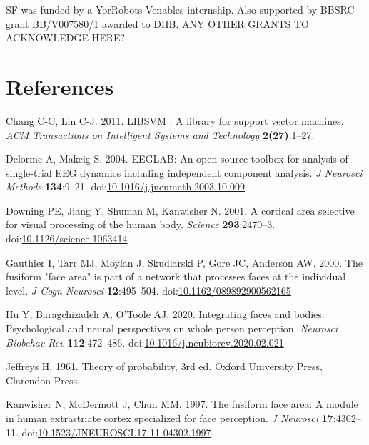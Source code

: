 \documentclass[
]{article}
\newlength{\cslhangindent}
\newlength{\cslentryspacingunit} %
\newenvironment{CSLReferences}[2] %
 {%
  \setlength{\parindent}{0pt}
  \ifodd #1
  \let\oldpar\par
  \def\par{\hangindent=\cslhangindent\oldpar}
  \fi
  \setlength{\parskip}{#2\cslentryspacingunit}
 }%
 {}
\begin{document}
SF was funded by a YorRobots Venables internship. Also supported by BBSRC grant BB/V007580/1 awarded to DHB. ANY OTHER GRANTS TO ACKNOWLEDGE HERE?

\hypertarget{references}{%
\section*{References}\label{references}}

\hypertarget{refs}{}
\begin{CSLReferences}{1}{0}
\leavevmode{}%
Chang C-C, Lin C-J. 2011. {LIBSVM} : A library for support vector machines. \emph{ACM Transactions on Intelligent Systems and Technology} \textbf{2(27)}:1--27.

\leavevmode{}%
Delorme A, Makeig S. 2004. {EEGLAB}: An open source toolbox for analysis of single-trial {EEG} dynamics including independent component analysis. \emph{J Neurosci Methods} \textbf{134}:9--21. doi:\href{https://doi.org/10.1016/j.jneumeth.2003.10.009}{10.1016/j.jneumeth.2003.10.009}

\leavevmode{}%
Downing PE, Jiang Y, Shuman M, Kanwisher N. 2001. A cortical area selective for visual processing of the human body. \emph{Science} \textbf{293}:2470--3. doi:\href{https://doi.org/10.1126/science.1063414}{10.1126/science.1063414}

\leavevmode{}%
Gauthier I, Tarr MJ, Moylan J, Skudlarski P, Gore JC, Anderson AW. 2000. The fusiform "face area" is part of a network that processes faces at the individual level. \emph{J Cogn Neurosci} \textbf{12}:495--504. doi:\href{https://doi.org/10.1162/089892900562165}{10.1162/089892900562165}

\leavevmode{}%
Hu Y, Baragchizadeh A, O'Toole AJ. 2020. Integrating faces and bodies: Psychological and neural perspectives on whole person perception. \emph{Neurosci Biobehav Rev} \textbf{112}:472--486. doi:\href{https://doi.org/10.1016/j.neubiorev.2020.02.021}{10.1016/j.neubiorev.2020.02.021}

\leavevmode{}%
Jeffreys H. 1961. Theory of probability, 3rd ed. Oxford University Press, Clarendon Press.

\leavevmode{}%
Kanwisher N, McDermott J, Chun MM. 1997. The fusiform face area: A module in human extrastriate cortex specialized for face perception. \emph{J Neurosci} \textbf{17}:4302--11. doi:\href{https://doi.org/10.1523/JNEUROSCI.17-11-04302.1997}{10.1523/JNEUROSCI.17-11-04302.1997}


\end{CSLReferences}
\end{document}
